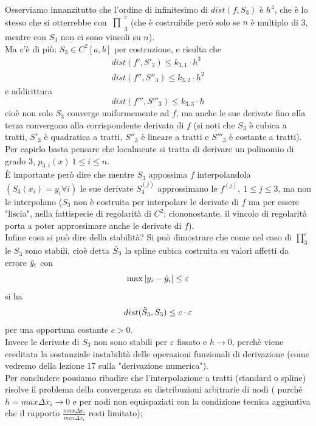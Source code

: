 \documentclass[12pt,a4paper]{article}
\newcommand{\inter}{\begin{matrix}\prod\end{matrix}}
\begin{document}
Osserviamo innanzitutto che l'ordine di infinitesimo di $dist(f, S_3)$ è $h^4$, che è lo stesso che si otterrebbe con $\inter_3^c$ (che è costruibile però solo se $n$ è multiplo di 3, mentre con $S_3$ non ci sono vincoli su $n$).\\
Ma c'è di più: $S_3 \in C^2 [a,b]$ per costruzione, e risulta che
\[
\begin{split}
    dist(f', S'_3) \leq k_{3,1} \cdot h^3 \\
    dist(f'', S''_3) \leq k_{3,2} \cdot h^2
\end{split}
\]
e addirittura
\[
dist(f''', S'''_3) \leq k_{3,3} \cdot h
\]
cioè non solo $S_3$ converge uniformemente ad $f$, ma anche le sue derivate fino alla terza convergono alla corrispondente derivata di $f$ (si noti che $S_3$ è cubica a tratti, $S'_3$ è quadratica a tratti, $S''_3$ è lineare a tratti e $S'''_3$ è costante a tratti).\\
Per capirlo basta pensare che localmente si tratta di derivare un polinomio di grado 3, $p_{3,i} (x) \ 1 \leq i \leq n$.\\
È importante però dire che mentre $S_3$ appossima $f$ interpolandola $(S_3 (x_i) = y_i \forall i)$ le sue derivate $S_3^{(j)}$ approssimano le $f^{(j)}, \ 1 \leq j \leq 3$, ma non le interpolano ($S_3$ non è costruita per interpolare le derivate di $f$ ma per essere "liscia", nella fattispecie di regolarità di $C^2$; ciononostante, il vincolo di regolarità porta a poter approssimare anche le derivate di $f$).\\
Infine cosa si può dire della stabilità? Si può dimostrare che come nel caso di $\prod_3^c$ le $S_3$ sono stabili, cioè detta $\Tilde{S}_3$ la spline cubica costruita su valori affetti da errore $\Tilde{y}_i$ con 
\[\max |y_i - \Tilde{y}_i| \le \varepsilon\]
si ha \[dist(\Tilde{S}_3, S_3) \le c \cdot \varepsilon\]
per una opportuna costante $c>0$.\\
Invece le derivate di $S_3$ non sono stabili per $\varepsilon$ fissato e $h \to 0$, perchè viene ereditata la sostanziale instabilità delle operazioni funzionali di derivazione (come vedremo della lezione 17 sulla "derivazione numerica").\\
Per concludere possiamo ribadire che l'interpolazione a tratti (standard o spline) risolve il problema della convergenza su distribuzioni arbitrarie di nodi ( purché $h=max\Delta x_i \rightarrow 0$ e per nodi non equispaziati con la condizione tecnica aggiuntiva che il rapporto $\frac{max\Delta x_i}{min\Delta x_i}$ resti limitato);\\
\end{document}
